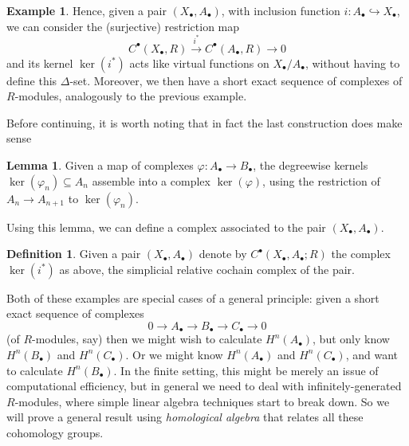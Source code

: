 \documentclass{tufte-handout}
\newcommand{\lecturenum}[1]{\marginnote{\color{red}Lecture #1}}
\theoremstyle{definition}
\newtheorem{lemma}{Lemma}
\newtheorem{definition}{Definition}
\newtheorem{example}{Example}
\begin{document}
\begin{example}
Hence,\lecturenum{24} given a pair $(X_\bullet,A_\bullet)$, with inclusion function $i\colon A_\bullet \hookrightarrow X_\bullet$, we can consider the 
(surjective) restriction map
\[
	C^\bullet(X_\bullet,R) \xrightarrow{i^*} C^\bullet(A_\bullet,R) \to 0
\]
and its kernel $\ker(i^*)$ acts like virtual functions on $X_\bullet/A_\bullet$, without 
having to define this $\Delta$-set. Moreover, we then have a short exact sequence of 
complexes of $R$-modules, analogously to the previous example.
\end{example}

Before continuing, it is worth noting that in fact the last construction does make sense

\begin{lemma}
Given a map of complexes $\varphi\colon A_\bullet \to B_\bullet$, the degreewise kernels
$\ker(\varphi_n) \subseteq A_n$ assemble into a complex $\ker(\varphi)$, using the restriction
of $A_n \to A_{n+1}$ to $\ker(\varphi_n)$.
\end{lemma}

Using this lemma, we can define a complex associated to the pair $(X_\bullet,A_\bullet)$.

\begin{definition}
Given a pair $(X_\bullet,A_\bullet)$ denote by $C^\bullet(X_\bullet,A_\bullet;R)$ the 
complex $\ker(i^*)$ as above, the simplicial relative cochain complex of the pair.
\end{definition}

Both of these examples are special cases of a general principle: given a short exact sequence 
of complexes
\[
	0\to A_\bullet \to B_\bullet \to C_\bullet \to 0
\]
(of $R$-modules, say) then we might wish to calculate $H^n(A_\bullet)$, but only know 
$H^n(B_\bullet)$ and $H^n(C_\bullet)$. Or we might know $H^n(A_\bullet)$ and 
$H^n(C_\bullet)$, and want to calculate $H^n(B_\bullet)$. In the finite setting, this 
might be merely an issue of computational efficiency, but in general we need to deal 
with infinitely-generated $R$-modules, where simple linear algebra techniques start to 
break down. So we will prove a general result using \emph{homological 
algebra} that relates all these cohomology groups.
\end{document}
